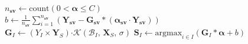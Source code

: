 \documentclass{article}
\newcommand{\set}[1]{{\left\{#1\right\}}}
\begin{document}
\begin{figure}[b!]
\begin{minipage}{\textwidth}
\begin{algorithm}[H]
\begin{algorithmic}[1]
\State $n_{\bm{sv}} \leftarrow \text{count}\left(0 < \bm \alpha \leq C \right)$ 
\State $b \leftarrow \frac{1}{n_{\bm{sv}}}\sum_{i=1}^{n_{\bm{sv}}} \left(\bm Y_{\bm{sv}} - \bm G_{\bm{sv}}*\left(\bm{\alpha_{\bm{sv}}} \cdot \bm Y_{\bm{sv}}\right)\right)$ 
\For {$I \in \set{1,\ldots,n}$} 
\State $\bm G_I \leftarrow (Y_I \times \bm Y_S) \bm \cdot \mathcal{K}\left( \mathcal{B}_I,\,\bm X_S,\,\sigma\right)$
\State $\bm S_I \leftarrow \text{argmax}_{i \in I}\left(\bm G_I*\bm{\alpha} + b \right)$ 
\EndFor
\EndWhile 
\end{algorithmic}
\end{algorithm}
\end{minipage}
\end{figure}
\end{document}
